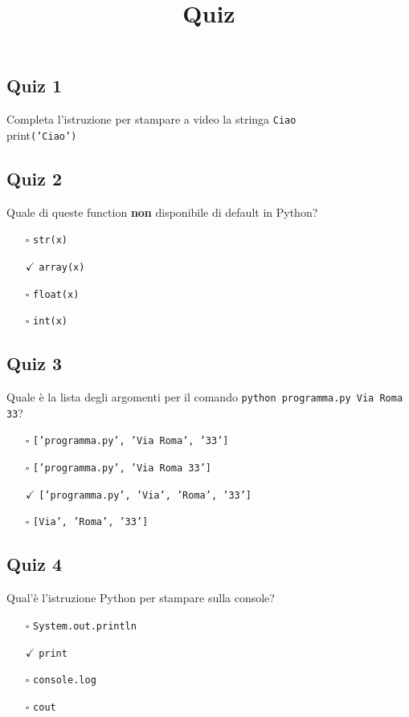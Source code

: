 \documentclass{article}
\title{Quiz}
\begin{document}
\pagestyle{fancy}
\fancyhf{}

\subsection*{Quiz 1}
Completa l'istruzione per stampare a video la stringa \texttt{Ciao}\\
print\texttt{('Ciao')}\subsection*{Quiz 2}
Quale di queste function \textbf{non} disponibile di default in Python?
\begin{itemize}
  \item[$\square$] \texttt{str(x)}
  \item[$\checkmark$] \texttt{array(x)}
  \item[$\square$] \texttt{float(x)}
  \item[$\square$] \texttt{int(x)}
\end{itemize}
\subsection*{Quiz 3}
Quale è la lista degli argomenti per il comando \texttt{python programma.py Via Roma 33}?
\begin{itemize}
  \item[$\square$] \texttt{['programma.py', 'Via Roma', '33']}
  \item[$\square$] \texttt{['programma.py', 'Via Roma 33']}
  \item[$\checkmark$] \texttt{['programma.py', 'Via', 'Roma', '33']}
  \item[$\square$] \texttt{[Via', 'Roma', '33']}
\end{itemize}
\subsection*{Quiz 4}
Qual'è l'istruzione Python per stampare sulla console?
\begin{itemize}
  \item[$\square$] \texttt{System.out.println}
  \item[$\checkmark$] \texttt{print}
  \item[$\square$] \texttt{console.log}
  \item[$\square$] \texttt{cout}
\end{itemize}
\end{document}
